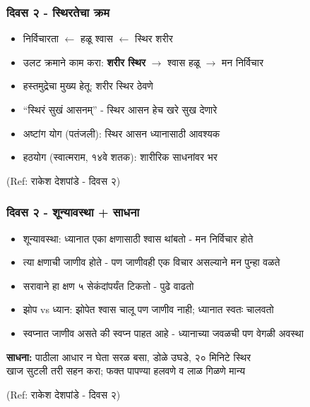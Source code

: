 \begin{frame}[fragile]\frametitle{दिवस २ - स्थिरतेचा क्रम}

	\begin{itemize}
	\item निर्विचारता $\leftarrow$ हळू श्वास $\leftarrow$ स्थिर शरीर
	\item उलट क्रमाने काम करा: \textbf{शरीर स्थिर} $\rightarrow$ श्वास हळू $\rightarrow$ मन निर्विचार
	\item हस्तमुद्रेचा मुख्य हेतू: शरीर स्थिर ठेवणे
	\item ``स्थिरं सुखं आसनम्'' - स्थिर आसन हेच खरे सुख देणारे
	\item अष्टांग योग (पतंजली): स्थिर आसन ध्यानासाठी आवश्यक
	\item हठयोग (स्वात्मराम, १४वे शतक): शारीरिक साधनांवर भर
	\end{itemize}

{\tiny (Ref: राकेश देशपांडे - दिवस २)}

\end{frame}

\begin{frame}[fragile]\frametitle{दिवस २ - शून्यावस्था + साधना}

	\begin{itemize}
	\item शून्यावस्था: ध्यानात एका क्षणासाठी श्वास थांबतो - मन निर्विचार होते
	\item त्या क्षणाची जाणीव होते - पण जाणीवही एक विचार असल्याने मन पुन्हा वळते
	\item सरावाने हा क्षण ५ सेकंदांपर्यंत टिकतो - पुढे वाढतो
	\item झोप vs ध्यान: झोपेत श्वास चालू पण जाणीव नाही; ध्यानात स्वतः चालवतो
	\item स्वप्नात जाणीव असते की स्वप्न पाहत आहे - ध्यानाच्या जवळची पण वेगळी अवस्था
	\end{itemize}

	\vspace{2mm}
	\textbf{साधना:} पाठीला आधार न घेता सरळ बसा, डोळे उघडे, २० मिनिटे स्थिर \\
	खाज सुटली तरी सहन करा; फक्त पापण्या हलवणे व लाळ गिळणे मान्य

{\tiny (Ref: राकेश देशपांडे - दिवस २)}

\end{frame}


